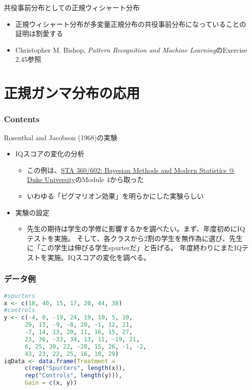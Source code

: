 \documentclass[aspectratio=169,unicode,dvipdfmx,14pt]{beamer}
\begin{document}
\begin{frame}{共役事前分布としての正規ウィシャート分布}
\begin{itemize}
\item 正規ウィシャート分布が多変量正規分布の共役事前分布になっていることの証明は割愛する
\item Christopher M. Bishop, \textit{Pattern Recognition and Machine Learning}のExercise 2.45参照
\end{itemize}
\end{frame}

\section{正規ガンマ分布の応用}

\begin{frame}\frametitle{Contents}
\Large \tableofcontents[currentsection]
\end{frame}

\begin{frame}{Rosenthal and Jacobson (1968)の実験}
\begin{itemize}
\item IQスコアの変化の分析
\begin{itemize}
\item この例は、\href{http://www2.stat.duke.edu/~rcs46/bayes17.html}{STA 360/602: Bayesian Methods and Modern Statistics @ Duke University}のModule 4から取った
\item いわゆる「ピグマリオン効果」を明らかにした実験らしい
\end{itemize}
\item 実験の設定
\begin{itemize}
\item 先生の期待は学生の学修に影響するかを調べたい。まず、年度初めにIQテストを実施。
そして、各クラスから2割の学生を無作為に選び、先生に「この学生は伸びる学生spurterだ」と告げる。
年度終わりにまたIQテストを実施。IQスコアの変化を調べる。
\end{itemize}
\end{itemize}
\end{frame}

\begin{frame}[fragile]
\FontMath
\frametitle{データ例}
\begin{lstlisting}[language=R]
#spurters
x <- c(18, 40, 15, 17, 20, 44, 38)
#controls
y <- c(-4, 0, -19, 24, 19, 10, 5, 10,
      29, 13, -9, -8, 20, -1, 12, 21,
      -7, 14, 13, 20, 11, 16, 15, 27,
      23, 36, -33, 34, 13, 11, -19, 21,
      6, 25, 30, 22, -28, 15, 26, -1, -2,
      43, 23, 22, 25, 16, 10, 29)
iqData <- data.frame(Treatment =
      c(rep("Spurters", length(x)),
      rep("Controls", length(y))),
      Gain = c(x, y))
\end{lstlisting}
\end{frame}
\end{document}
